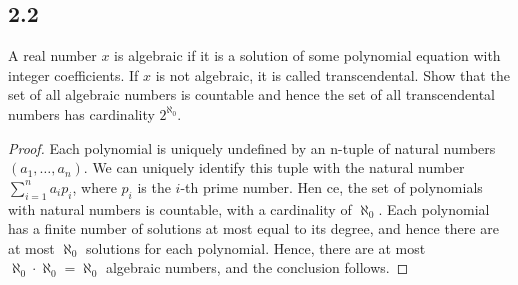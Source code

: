 \subsection*{2.2} A real number $x$ is algebraic if it is a solution of some polynomial equation with integer coefficients. If $x$ is not algebraic, it is called transcendental. Show that the set of all algebraic numbers is countable and hence
the set of all transcendental numbers has cardinality $2^{\aleph_0}$.

\begin{proof}
Each polynomial is uniquely undefined by an n-tuple of natural numbers $(a_1, \dots, a_n)$. We can uniquely identify this tuple with the natural number $\sum_{i=1}^n a_ip_i$, where $p_i$ is the $i$-th prime number. Hen
ce, the set of polynomials with natural numbers is countable, with a cardinality of $\aleph_0$. Each polynomial has a finite number of solutions at most equal to its degree, and hence there are at most $\aleph_0$ solutions for each polynomial. Hence, there are at most $\aleph_0 \cdot \aleph_0 = \aleph_0$ algebraic numbers, and the conclusion follows.
\end{proof}

